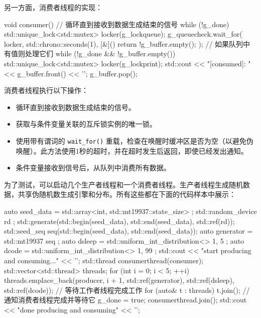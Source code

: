 另一方面，消费者线程的实现：

\begin{cpp}
void consumer()
{
    // 循环直到接收到数据生成结束的信号
    while (!g_done)
    {
        std::unique_lock<std::mutex> locker(g_lockqueue);
        g_queuecheck.wait_for(
        locker,
        std::chrono::seconds(1),
        [&]() {return !g_buffer.empty(); });
        // 如果队列中有值则处理它们
        while (!g_done && !g_buffer.empty())
        {
            std::unique_lock<std::mutex> locker(g_lockprint);
            std::cout << "[consumed]: " << g_buffer.front() << '\n';
            g_buffer.pop();
        }
    }
}
\end{cpp}

消费者线程执行以下操作：

\begin{itemize}
\item
循环直到接收到数据生成结束的信号。

\item
获取与条件变量关联的互斥锁实例的唯一锁。

\item
使用带有谓词的 \verb|wait_for()| 重载，检查在唤醒时缓冲区是否为空（以避免伪唤醒）。此方法使用1秒的超时，并在超时发生后返回，即使已经发出通知。

\item
条件变量接收到信号后，从队列中消费所有数据。
\end{itemize}

为了测试，可以启动几个生产者线程和一个消费者线程。生产者线程生成随机数据，共享伪随机数生成引擎和分布。所有这些都在下面的代码样本中展示：

\begin{cpp}
auto seed_data = std::array<int, std::mt19937::state_size> {};
std::random_device rd {};
std::generate(std::begin(seed_data), std::end(seed_data),
              std::ref(rd));
std::seed_seq seq(std::begin(seed_data), std::end(seed_data));
auto generator = std::mt19937{ seq };
auto dsleep = std::uniform_int_distribution<>{ 1, 5 };
auto dcode = std::uniform_int_distribution<>{ 1, 99 };
std::cout << "start producing and consuming..." << '\n';
std::thread consumerthread(consumer);
std::vector<std::thread> threads;
for (int i = 0; i < 5; ++i)
{
    threads.emplace_back(producer,
                         i + 1,
                         std::ref(generator),
                         std::ref(dsleep),
                         std::ref(dcode));
}
// 等待工作者线程完成工作
for (auto& t : threads)
    t.join();
// 通知消费者线程完成并等待它
g_done = true;
consumerthread.join();
std::cout << "done producing and consuming" << '\n';
\end{cpp}

